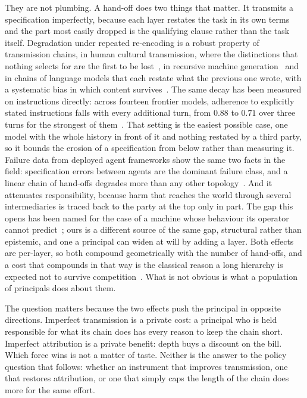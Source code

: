 \documentclass[11pt,a4paper]{article}
\theoremstyle{definition}
\begin{document}
They are not plumbing. A hand-off does two things that matter. It transmits a
specification imperfectly, because each layer restates the task in its own
terms and the part most easily dropped is the qualifying clause rather than the
task itself. Degradation under repeated re-encoding is a robust property of
transmission chains, in human cultural transmission, where the distinctions
that nothing selects for are the first to be lost~\citep{kirby2008cumulative},
in recursive machine generation~\citep{shumailov2024collapse,alemohammad2023mad}
and in chains of language models that each restate what the previous one
wrote, with a systematic bias in which content
survives~\citep{perez2025telephone,acerbi2023transmission}. The same decay has
been measured on instructions directly: across fourteen frontier models,
adherence to explicitly stated instructions falls with every additional turn,
from $0.88$ to $0.71$ over three turns for the strongest of
them~\citep{he2024multiif}. That setting is the easiest possible case, one model with
the whole history in front of it and nothing restated by a third party, so it
bounds the erosion of a specification from below rather than measuring it.
Failure data from
deployed agent frameworks show the same two facts in the field: specification
errors between agents are the dominant failure class, and a linear chain of
hand-offs degrades more than any other
topology~\citep{cemri2025mast,huang2025resilience}. And it
attenuates responsibility, because harm that reaches the world through several
intermediaries is traced back to the party at the top only in part. The gap
this opens has been named for the case of a machine whose behaviour its
operator cannot predict~\citep{matthias2004gap}; ours is a different source of
the same gap, structural rather than epistemic, and one a principal can widen
at will by adding a layer. Both
effects are per-layer, so both compound geometrically with the number of
hand-offs, and a cost that compounds in that way is the classical reason a long
hierarchy is expected not to survive competition~\citep{mcafee1995diseconomies}.
What is not obvious is what a population of principals does about
them.

The question matters because the two effects push the principal in opposite
directions. Imperfect transmission is a private cost: a principal who is held
responsible for what its chain does has every reason to keep the chain short.
Imperfect attribution is a private benefit: depth buys a discount on the bill.
Which force wins is not a matter of taste. Neither is the answer to the policy
question that follows: whether an instrument that improves transmission, one
that restores attribution, or one that simply caps the length of the chain does
more for the same effort.
\end{document}
